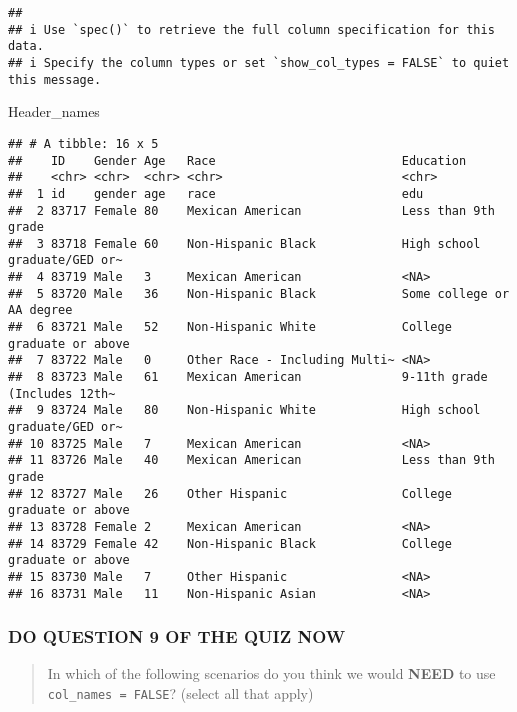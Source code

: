 \documentclass[
]{book}
\newenvironment{Shaded}{\begin{snugshade}}{\end{snugshade}}
\newcommand{\NormalTok}[1]{#1}
\begin{document}
\begin{verbatim}
##
## i Use `spec()` to retrieve the full column specification for this data.
## i Specify the column types or set `show_col_types = FALSE` to quiet this message.
\end{verbatim}

\begin{Shaded}
\begin{Highlighting}[]
\NormalTok{Header\_names}
\end{Highlighting}
\end{Shaded}

\begin{verbatim}
## # A tibble: 16 x 5
##    ID    Gender Age   Race                          Education
##    <chr> <chr>  <chr> <chr>                         <chr>
##  1 id    gender age   race                          edu
##  2 83717 Female 80    Mexican American              Less than 9th grade
##  3 83718 Female 60    Non-Hispanic Black            High school graduate/GED or~
##  4 83719 Male   3     Mexican American              <NA>
##  5 83720 Male   36    Non-Hispanic Black            Some college or AA degree
##  6 83721 Male   52    Non-Hispanic White            College graduate or above
##  7 83722 Male   0     Other Race - Including Multi~ <NA>
##  8 83723 Male   61    Mexican American              9-11th grade (Includes 12th~
##  9 83724 Male   80    Non-Hispanic White            High school graduate/GED or~
## 10 83725 Male   7     Mexican American              <NA>
## 11 83726 Male   40    Mexican American              Less than 9th grade
## 12 83727 Male   26    Other Hispanic                College graduate or above
## 13 83728 Female 2     Mexican American              <NA>
## 14 83729 Female 42    Non-Hispanic Black            College graduate or above
## 15 83730 Male   7     Other Hispanic                <NA>
## 16 83731 Male   11    Non-Hispanic Asian            <NA>
\end{verbatim}

\hypertarget{do-question-9-of-the-quiz-now-1}{%
\subsubsection{DO QUESTION 9 OF THE QUIZ NOW}\label{do-question-9-of-the-quiz-now-1}}

\begin{quote}
In which of the following scenarios do you think we would \textbf{NEED} to use \texttt{col\_names\ =\ FALSE}? (select all that apply)
\end{quote}
\end{document}
